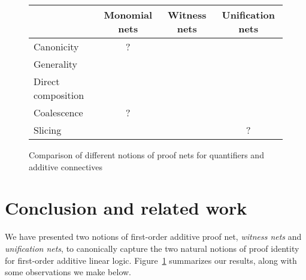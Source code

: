 \documentclass[twoside,a4paper]{article}
\newcommand\xmark{{\color{red}\ding{55}}}
\newcommand\vmark{{\color{green}\ding{51}}}
\newcommand\+{+}
\renewcommand\*{\times}
\begin{document}
%

\begin{figure}[!t]
\begin{center}
\begin{tabular}{lccc}
 &	Monomial nets & Witness nets & Unification nets
\\\hline
   Canonicity          &    ?   & \vmark & \vmark
\\ Generality          & \xmark & \xmark & \vmark
\\ Direct composition  & \xmark & \vmark & \vmark
\\ Coalescence         &    ?   & \vmark & \vmark
\\ Slicing             & \vmark & \vmark &   ?
\end{tabular}  
  \caption{Comparison of different notions of proof nets for quantifiers and additive connectives}
  \label{fig:results}
\end{center}
\end{figure}



\section{Conclusion and related work}

We have presented two notions of first-order additive proof net, \emph{witness nets} and \emph{unification nets}, to canonically capture the two natural notions of proof identity for first-order additive linear logic. Figure~\ref{fig:results} summarizes our results, along with some observations we make below. 
\end{document}
